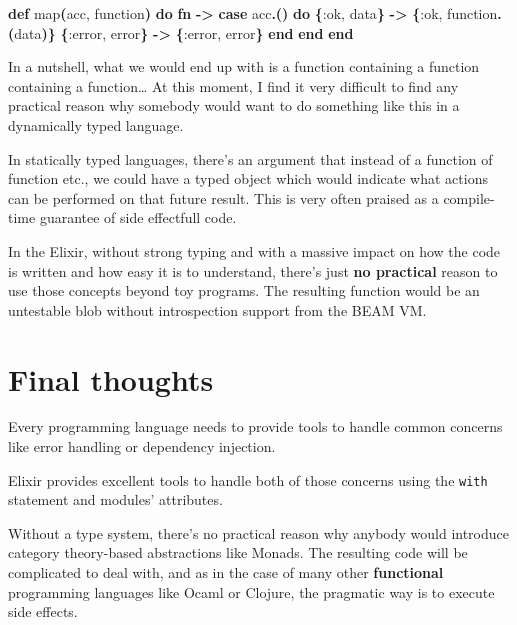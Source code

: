 \documentclass[
  oneside]{book}
\newenvironment{Shaded}{\begin{snugshade}}{\end{snugshade}}
\newcommand{\FunctionTok}[1]{\textcolor[rgb]{0.13,0.29,0.53}{\textbf{#1}}}
\newcommand{\KeywordTok}[1]{\textcolor[rgb]{0.13,0.29,0.53}{\textbf{#1}}}
\newcommand{\NormalTok}[1]{#1}
\newcommand{\OperatorTok}[1]{\textcolor[rgb]{0.81,0.36,0.00}{\textbf{#1}}}
\newcommand{\VariableTok}[1]{\textcolor[rgb]{0.00,0.00,0.00}{#1}}
\begin{document}
\begin{Shaded}
\begin{Highlighting}[]
  \KeywordTok{def}\NormalTok{ map}\FunctionTok{(}\NormalTok{acc, function}\FunctionTok{)} \KeywordTok{do}
    \KeywordTok{fn} \OperatorTok{{-}\textgreater{}}
      \KeywordTok{case}\NormalTok{ acc}\OperatorTok{.}\FunctionTok{()} \KeywordTok{do}
        \FunctionTok{\{}\VariableTok{:ok}\NormalTok{, data}\FunctionTok{\}} \OperatorTok{{-}\textgreater{}} \FunctionTok{\{}\VariableTok{:ok}\NormalTok{, function}\OperatorTok{.}\FunctionTok{(}\NormalTok{data}\FunctionTok{)\}}
        \FunctionTok{\{}\VariableTok{:error}\NormalTok{, error}\FunctionTok{\}} \OperatorTok{{-}\textgreater{}} \FunctionTok{\{}\VariableTok{:error}\NormalTok{, error}\FunctionTok{\}}
      \KeywordTok{end}
    \KeywordTok{end}
  \KeywordTok{end}
\end{Highlighting}
\end{Shaded}

In a nutshell, what we would end up with is a function containing a function containing a function\ldots{} At this moment, I find it very difficult to find any practical reason why somebody would want to do something like this in a dynamically typed language.

In statically typed languages, there's an argument that instead of a function of function etc., we could have a typed object which would indicate what actions can be performed on that future result. This is very often praised as a compile-time guarantee of side effectfull code.

In the Elixir, without strong typing and with a massive impact on how the code is written and how easy it is to understand, there's just \textbf{no practical} reason to use those concepts beyond toy programs. The resulting function would be an untestable blob without introspection support from the BEAM VM.

\newpage

\section{Final thoughts}\label{final-thoughts}

Every programming language needs to provide tools to handle common concerns like error handling or dependency injection.

Elixir provides excellent tools to handle both of those concerns using the \texttt{with} statement and modules' attributes.

Without a type system, there's no practical reason why anybody would introduce category theory-based abstractions like Monads. The resulting code will be complicated to deal with, and as in the case of many other \textbf{functional} programming languages like Ocaml or Clojure, the pragmatic way is to execute side effects.
\end{document}
